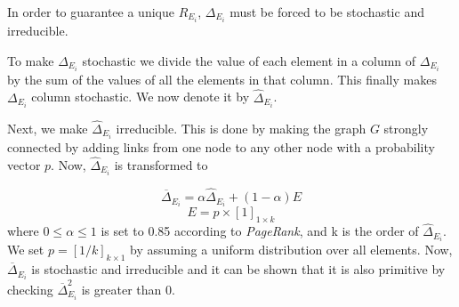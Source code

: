 In order to guarantee a unique $R_{E_{i}}$, $\Delta_{E_{i}}$ must be forced to be stochastic and irreducible. 

To make $\Delta_{E_{i}}$ stochastic we divide the value of each element in a column of $\Delta_{E_{i}}$ by the sum of the values of all the elements in that column. This finally makes $\Delta_{E_{i}}$ column stochastic. We now denote it by $\hat \Delta_{E_{i}}$.

Next, we make $\hat \Delta_{E_{i}}$ irreducible. This is done by making the graph $G$ strongly connected by adding links from one node to any other node with a probability vector $p$. Now, $\hat \Delta_{E_{i}}$ is transformed to 

\begin{equation}
\overline \Delta_{E_{i}} = \alpha \hat \Delta_{E_{i}} + (1-\alpha)E
\end{equation}
\begin{equation}
E = p \times [1]_{1 \times k}
\end{equation}
where $0 \le \alpha \le 1$ is set to 0.85 according to \textit{PageRank}, and k is the order of $\hat \Delta_{E_{i}}$. We set $p = [1/k]_{k \times 1}$ by assuming a uniform distribution over all elements. Now, $\overline \Delta_{E_{i}}$ is stochastic and irreducible and it can be shown that it is also primitive by checking $\overline \Delta_{E_{i}}^{2}$ is greater than $0$.

